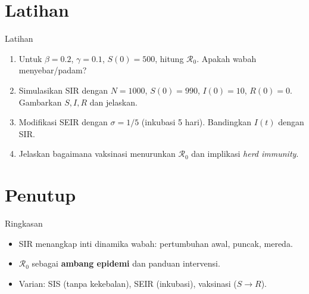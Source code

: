 \documentclass[aspectratio=32]{beamer}
\newcommand{\jsg}[1]{\textcolor{teal!60!black}{\textbf{#1}}}
\newcommand{\Rzero}{\mathcal R_0}
\begin{document}
\section{Latihan}

\begin{frame}{Latihan}
\begin{enumerate}
  \item Untuk $\beta=0.2$, $\gamma=0.1$, $S(0)=500$, hitung $\Rzero$. Apakah wabah menyebar/padam?
  \item Simulasikan SIR dengan $N=1000$, $S(0)=990$, $I(0)=10$, $R(0)=0$. Gambarkan $S,I,R$ dan jelaskan.
  \item Modifikasi SEIR dengan $\sigma=1/5$ (inkubasi 5 hari). Bandingkan $I(t)$ dengan SIR.
  \item Jelaskan bagaimana vaksinasi menurunkan $\Rzero$ dan implikasi \textit{herd immunity}.
\end{enumerate}
\end{frame}

\section{Penutup}

\begin{frame}{Ringkasan}
\begin{itemize}
  \item SIR menangkap inti dinamika wabah: pertumbuhan awal, puncak, mereda.
  \item $\Rzero$ sebagai \jsg{ambang epidemi} dan panduan intervensi.
  \item Varian: SIS (tanpa kekebalan), SEIR (inkubasi), vaksinasi ($S\to R$).
\end{itemize}
\end{frame}
\end{document}
